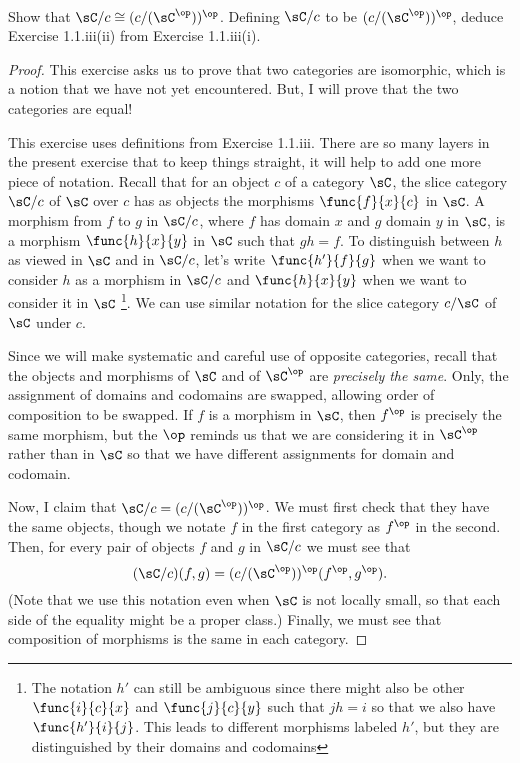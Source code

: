 \documentclass[main.tex]{subfiles}
\begin{document}
\paragraph{}
\begin{exercise}
	Show that \(\sC/c\cong(c/(\sC^\op ))^\op\). Defining \(\sC/c\) to be
	\((c/(\sC^\op))^\op\), deduce Exercise 1.1.iii(ii) from Exercise 1.1.iii(i).
\end{exercise}

\begin{proof}
	This exercise asks us to prove that two categories are isomorphic, which is
	a notion that we have not yet encountered. But, I will prove that the two
	categories are equal!

	This exercise uses definitions from Exercise 1.1.iii. There are so many
	layers in the present exercise that to keep things straight, it will help to
	add one more piece of notation. Recall that for an object \(c\) of a
	category \(\sC\), the slice category \(\sC/c\) of \(\sC\) over \(c\) has as
	objects the morphisms \(\func{f}{x}{c}\) in \(\sC\). A morphism from \(f\)
	to \(g\) in \(\sC/c\), where \(f\) has domain \(x\) and \(g\) domain \(y\)
	in \(\sC\), is a morphism \(\func{h}{x}{y}\) in \(\sC\) such that \(gh=f\).
	To distinguish between \(h\) as viewed in \(\sC\) and in \(\sC/c\), let's
	write \(\func{h'}{f}{g}\) when we want to consider \(h\) as a morphism in
	\(\sC/c\) and \(\func{h}{x}{y}\) when we want to consider it in \(\sC\)%
	\footnote{The notation \(h'\) can still be ambiguous since there might also
		be other \(\func{i}{c}{x}\) and \(\func{j}{c}{y}\) such that \(jh=i\) so
		that we also have \(\func{h'}{i}{j}\). This leads to different morphisms
		labeled \(h'\), but they are distinguished by their domains and
	codomains}. We can use similar notation for the slice category \(c/\sC\) of
	\(\sC\) under \(c\).

	Since we will make systematic and careful use of opposite categories, recall
	that the objects and morphisms of \(\sC\) and of \(\sC^\op\) are
	\emph{precisely the same}. Only, the assignment of domains and codomains are
	swapped, allowing order of composition to be swapped. If \(f\) is a morphism
	in \(\sC\), then \(f^\op\) is precisely the same morphism, but the \(\op\)
	reminds us that we are considering it in \(\sC^\op\) rather than in \(\sC\)
	so that we have different assignments for domain and codomain.

	Now, I claim that \(\sC/c=(c/(\sC^\op))^\op\). We must first check that they
	have the same objects, though we notate \(f\) in the first category as
	\(f^\op\) in the second. Then, for every pair of objects \(f\) and \(g\) in
	\(\sC/c\) we must see that \[(\sC/c)(f,g)=(c/(\sC^\op))^\op(f^\op, g^\op).\]
	(Note that we use this notation even when \(\sC\) is not locally small, so
	that each side of the equality might be a proper class.) Finally, we must
	see that composition of morphisms is the same in each category.


\end{proof}
\end{document}
